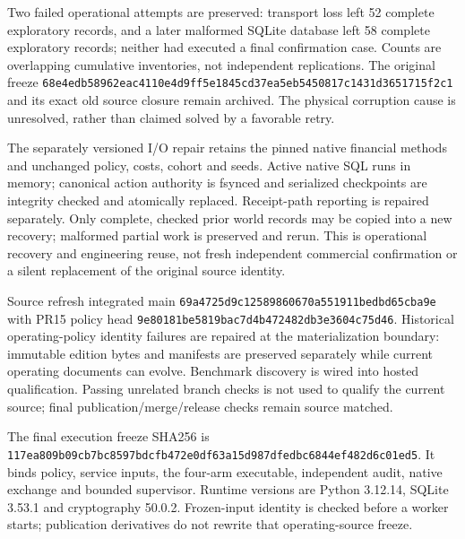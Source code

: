 \documentclass[10pt,letterpaper]{article}
\begin{document}
Two failed operational attempts are preserved: transport loss left 52 complete exploratory records, and a later malformed SQLite database left 58 complete exploratory records; neither had executed a final confirmation case. Counts are overlapping cumulative inventories, not independent replications. The original freeze \texttt{68e4edb5\allowbreak{}8962eac4\allowbreak{}110e4d9f\allowbreak{}f5e1845c\allowbreak{}d37ea5eb\allowbreak{}5450817c\allowbreak{}1431d365\allowbreak{}1715f2c1} and its exact old source closure remain archived. The physical corruption cause is unresolved, rather than claimed solved by a favorable retry.

The separately versioned I/O repair retains the pinned native financial methods and unchanged policy, costs, cohort and seeds. Active native SQL runs in memory; canonical action authority is fsynced and serialized checkpoints are integrity checked and atomically replaced. Receipt-path reporting is repaired separately. Only complete, checked prior world records may be copied into a new recovery; malformed partial work is preserved and rerun. This is operational recovery and engineering reuse, not fresh independent commercial confirmation or a silent replacement of the original source identity.

Source refresh integrated main \texttt{69a4725d\allowbreak{}9c125898\allowbreak{}60670a55\allowbreak{}1911bedb\allowbreak{}d65cba9e} with PR15 policy head \texttt{9e80181b\allowbreak{}e5819bac\allowbreak{}7d4b4724\allowbreak{}82db3e36\allowbreak{}04c75d46}. Historical operating-policy identity failures are repaired at the materialization boundary: immutable edition bytes and manifests are preserved separately while current operating documents can evolve. Benchmark discovery is wired into hosted qualification. Passing unrelated branch checks is not used to qualify the current source; final publication/merge/release checks remain source matched.

The final execution freeze SHA256 is \texttt{117ea809\allowbreak{}b09cb7bc\allowbreak{}8597bdcf\allowbreak{}b472e0df\allowbreak{}63a15d98\allowbreak{}7dfedbc6\allowbreak{}844ef482\allowbreak{}d6c01ed5}. It binds policy, service inputs, the four-arm executable, independent audit, native exchange and bounded supervisor. Runtime versions are Python 3.12.14, SQLite 3.53.1 and cryptography 50.0.2. Frozen-input identity is checked before a worker starts; publication derivatives do not rewrite that operating-source freeze.
\end{document}

